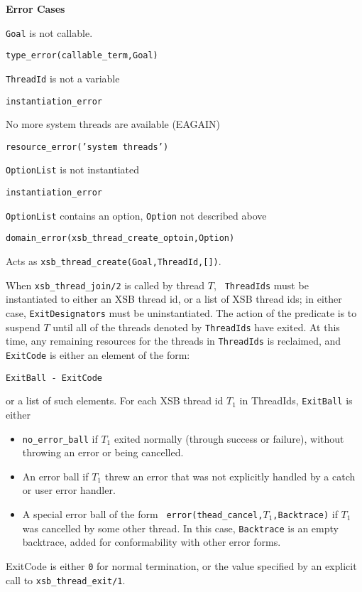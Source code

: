 \begin{description}
{\bf Error Cases}
\bi
\item 	{\tt Goal} is not callable.
\bi
\item 	{\tt type\_error(callable\_term,Goal)}
\ei
\item 	{\tt ThreadId} is not a variable
\bi
\item 	{\tt instantiation\_error}
\ei
\item   No more system threads are available (EAGAIN)
\bi
\item {\tt resource\_error('system threads')}
\ei
\item 	{\tt OptionList} is not instantiated
\bi
\item 	{\tt instantiation\_error}
\ei
\item 	{\tt OptionList} contains an option, {\tt Option} not described above
\bi
\item 	{\tt domain\_error(xsb\_thread\_create\_optoin,Option)}
\ei
\ei

%
Acts as {\tt xsb\_thread\_create(Goal,ThreadId,[])}.

% 
When {\tt xsb\_thread\_join/2} is called by thread $T$, {\tt
  ThreadIds} must be instantiated to either an XSB thread id, or a
list of XSB thread ids; in either case, {\tt ExitDesignators} must be
uninstantiated.  The action of the predicate is to suspend $T$ until
all of the threads denoted by {\tt ThreadIds} have exited.  At this
time, any remaining resources for the threads in {\tt ThreadIds} is
reclaimed, and {\tt ExitCode} is either an element of the form:
\begin{center}
{\tt ExitBall -  ExitCode} 
\end{center}
%
or a list of such elements.  For each XSB thread id $T_1$ in
{ThreadIds}, {\tt ExitBall} is either
\begin{itemize}
%
\item {\tt no\_error\_ball} if $T_1$ exited normally (through success or
  failure), without throwing an error or being cancelled.
%
\item An error ball if $T_1$ threw an error that was not explicitly
  handled by a catch or user error handler.
%
\item A special error ball of the form {\tt
  error(thead\_cancel,$T_1$,Backtrace)} if $T_1$ was cancelled by some
  other thread.  In this case, {\tt Backtrace} is an empty backtrace,
  added for conformability with other error forms.
\end{itemize}
%
ExitCode is either {\tt 0} for normal termination, or the value
specified by an explicit call to {\tt xsb\_thread\_exit/1}.


\end{description}

